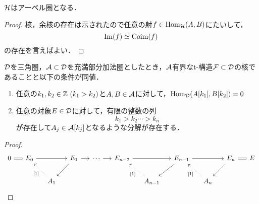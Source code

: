 \begin{thm}
	${\mathcal H}$はアーベル圏となる．
\end{thm}
\begin{proof}
	核，余核の存在は示されたので任意の射$f\in\operatorname{\mathrm{Hom}}_{{\mathcal H}}(A,B)$にたいして，
\[\Im(f)\simeq \mathrm{Coim}(f)\]
の存在を言えばよい．
\end{proof}

\begin{lemm}
	${\mathcal D}$を三角圏，${\mathcal A}\subset{\mathcal D}$を充満部分加法圏としたとき，${\mathcal A}$有界なt-構造${\mathcal F}\subset{\mathcal D}$の核であることと以下の条件が同値．\vspace{-3mm}
	\begin{enumerate}[label=\roman*.]
		\item
			任意の$k_1,k_2\in\ZZ\ (k_1>k_2)$と$A,B\in{\mathcal A}$に対して，$\operatorname{\mathrm{Hom}}_{{\mathcal D}}(A[k_1],B[k_2])=0$
		\item
			任意の対象$E\in{\mathcal D}$に対して，有限の整数の列
			\[k_1>k_2 \cdots > k_n\]
			が存在して$A_j\in {\mathcal A}[k_j]$となるような分解が存在する．
	\end{enumerate}
\end{lemm}
\begin{proof}
	\[
		\begin{tikzcd}[column sep=1.3em]
			0\ar[r,equal]&E_0\ar[rr]& & E_{1}\ar[r]\ar[ld] &\cdots\ar[r] &E_{n-2}\ar[rr]&&E_{n-1}\ar[ld]\ar[rr]&&E_n\ar[ld]\ar[r,equal]&E\\
									 &&A_{1}\ar[lu,dotted,"{[1]}"] &&&&A_{n-1}\ar[lu,dotted,"{[1]}"]&&A_n\ar[lu,dotted,"{[1]}"]
		\end{tikzcd}
	\]
				
	\end{proof}
